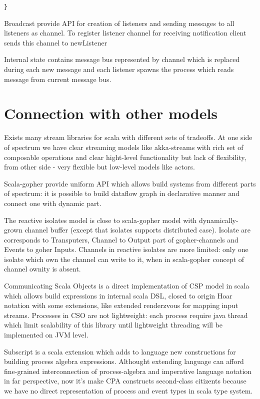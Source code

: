 \documentclass[12pt]{article}
\begin{document}
\begin{itemize}
\begin{Verbatim}[fontsize=\small]
}
\end{Verbatim}

 Broadcast provide API for creation of listeners and sending messages to all listeners as channel.
To register listener channel for receiving notification client sends this channel to newListener
  
 Internal state contains message bus represented by channel which is replaced during each new message and each listener spawns the process which reads message from current message bus.


\end{itemize}

 
\section{ Connection with other models }

 Exists many stream libraries for scala with different sets of tradeoffs. At one side of
spectrum we have clear streaming models like akka-streams\cite{akka-streams} with rich set
of composable operations and clear hight-level functionality but lack of flexibility,
from other side - very flexible but low-level models like actors.

 Scala-gopher provide uniform API which allows build systems from different parts of spectrum:
it is possible to build dataflow graph in declarative manner and connect one with dynamic part.

 The reactive isolates model\cite{Prokopec:2015:ICE:2814228.2814245} is close to scala-gopher model with dynamically-grown channel buffer (except that isolates supports distributed case).
 Isolate are corresponds to Transputers, Channel to Output part of gopher-channels and Events to goher Inputs. Channels in reactive isolates are more limited: only one isolate which own the channel can write to it, when in scala-gopher concept of channel ownity is absent. 

 Communicating Scala Objects\cite{CSO} is a direct implementation of CSP model in scala which allows
build expressions in internal scala DSL, closed to origin Hoar notation with some extensions, like extended renderzvous for mapping input streams.  Processes in CSO are not lightweight: each process require java thread which limit scalability of this library until lightweight threading will be implemented on JVM level.

 Subscript\cite{vanDelft:2013:DCL:2489837.2489849} is a scala extension which adds to language new constructions for building process algebra expressions. Althought extending language can afford fine-grained interconnection of process-algebra and imperative language notation in far perspective, now it's make CPA constructs second-class citizents because we have no direct representation of process and event types in scala type system.
\end{document}
